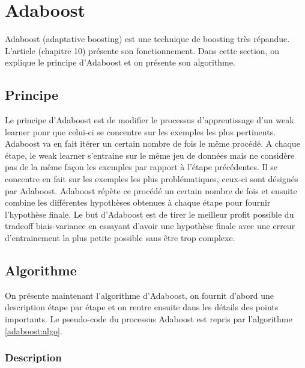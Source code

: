 \documentclass[french]{article}
\theoremstyle{definition}
\theoremstyle{remark}
\begin{document}
\renewcommand{\labelitemi}{$\bullet$}
\section{Adaboost}

Adaboost (adaptative boosting) est une technique de boosting très répandue. L'article \cite{} (chapitre 10) présente son fonctionnement. Dans cette section, on explique le principe d'Adaboost et on présente son algorithme.  

\subsection{Principe}

Le principe d'Adaboost est de modifier le processus d'apprentissage d'un weak learner pour que celui-ci se concentre sur les exemples les plus pertinents. Adaboost va en fait itérer un certain nombre de fois le même procédé. A chaque étape, le weak learner s'entraine sur le même jeu de données mais ne considère pas de la même façon les exemples par rapport à l'étape précédentes. Il se concentre en fait sur les exemples les plus problématiques, ceux-ci sont désignés par Adaboost. Adaboost répète ce procédé un certain nombre de fois et ensuite combine les différentes hypothèses obtenues à chaque étape pour fournir l'hypothèse finale. Le but d'Adaboost est de tirer le meilleur profit possible du tradeoff biais-variance en essayant d'avoir une hypothèse finale avec une erreur d'entrainement la plus petite possible sans être trop complexe.

\subsection{Algorithme}

On présente maintenant l'algorithme d'Adaboost, on fournit d'abord une description étape par étape et on rentre ensuite dans les détails des points importants. Le pseudo-code du processus Adaboost est repris par l'algorithme \ref{adaboost:algo}.

\subsubsection{Description}
\end{document}
